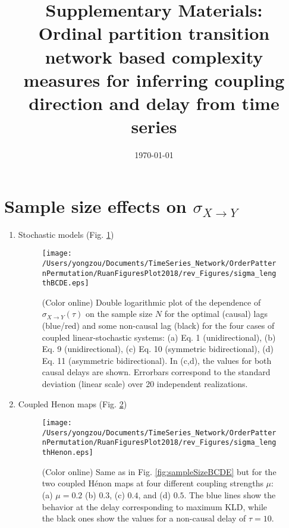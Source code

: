 \documentclass[aps,pre,superscriptaddress,floats,11pt]{revtex4}
\begin{document}
\title{Supplementary Materials: \\ Ordinal partition transition network based complexity measures for inferring coupling direction and delay from time series}

\date{\today}

\maketitle

\renewcommand{\thepage}{SM-\arabic{page}}  
\renewcommand{\thesection}{SM-\Roman{section}}   
\renewcommand{\theequation}{S\arabic{equation}}  
\renewcommand{\thetable}{S\arabic{table}}   
\renewcommand{\thefigure}{S\arabic{figure}}


\section{Sample size effects on $\sigma_{X\to Y}$}
\begin{enumerate}
\item Stochastic models (Fig. \ref{fig:sampleSizeBCDEsigma})
\begin{figure}[htb]
	\centering
	\texttt{[image: /Users/yongzou/Documents/TimeSeries\_Network/OrderPatternPermutation/RuanFiguresPlot2018/rev\_Figures/sigma\_lengthBCDE.eps]}
\caption{(Color online) Double logarithmic plot of the dependence of $\sigma_{X\to Y}(\tau)$ on the sample size $N$ for the optimal (causal) lags (blue/red) and some non-causal lag (black) for the four cases of coupled linear-stochastic systems: (a) Eq. 1 (unidirectional), (b) Eq. 9 (unidirectional), (c) Eq. 10 (symmetric bidirectional), (d) Eq. 11 (asymmetric bidirectional). In (c,d), the values for both causal delays are shown. Errorbars correspond to the standard deviation (linear scale) over 20 independent realizations.  \label{fig:sampleSizeBCDEsigma}}
\end{figure}

\item Coupled Henon maps (Fig. \ref{fig:sampleSizeHenonsigma})
\begin{figure}[htb]
	\centering
	\texttt{[image: /Users/yongzou/Documents/TimeSeries\_Network/OrderPatternPermutation/RuanFiguresPlot2018/rev\_Figures/sigma\_lengthHenon.eps]}
\caption{(Color online) Same as in Fig. \ref{fig:sampleSizeBCDE} but for the two coupled H\'enon maps at four different coupling strengths $\mu$: (a) $\mu=0.2$ (b) $0.3$, (c) $0.4$, and (d) $0.5$. The blue lines show the behavior at the delay corresponding to maximum KLD, while the black ones show the values for a non-causal delay of $\tau=10$. \label{fig:sampleSizeHenonsigma}}
\end{figure}


\end{enumerate}
\end{document}
